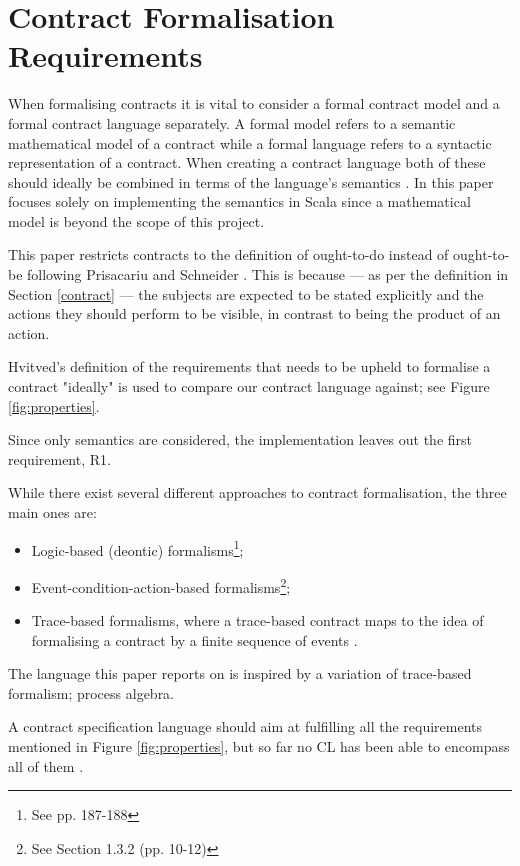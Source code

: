 \documentclass{ituthesis}
\begin{document}
\section{Contract Formalisation Requirements} \label{requirements}
When formalising contracts it is vital to consider a formal contract model and a formal contract language separately. A formal model refers to a semantic mathematical model of a contract while a formal language refers to a syntactic representation of a contract. When creating a contract language both of these should ideally be combined in terms of the language's semantics \cite{hvitved2011contract}. In this paper focuses solely on implementing the semantics in Scala since a mathematical model is beyond the scope of this project.

This paper restricts contracts to the definition of ought-to-do instead of ought-to-be following Prisacariu and Schneider \cite{prisacariu2007formal}. This is because --- as per the definition in Section \ref{contract} --- the subjects are expected to be stated explicitly and the actions they should perform to be visible, in contrast to being the product of an action. 

Hvitved's definition of the requirements that needs to be upheld to formalise a contract "ideally" is used to compare our contract language against; see Figure \ref{fig:properties}.

Since only semantics are considered, the implementation leaves out the first requirement, R1.

While there exist several different approaches to contract formalisation, the three main ones are:
\begin{itemize}
    \item Logic-based (deontic) formalisms\footnote{See \cite{hvitved2011contract} pp. 187-188};
    \item Event-condition-action-based formalisms\footnote{See \cite{hvitved2011contract} Section 1.3.2 (pp. 10-12)};
    \item Trace-based formalisms, where a trace-based contract maps to the idea of formalising a contract by a finite sequence of events \cite{andersen2006compositional}.
\end{itemize}

The language this paper reports on is inspired by a variation of trace-based formalism; process algebra.

A contract specification language should aim at fulfilling all the requirements mentioned in Figure \ref{fig:properties}, but so far no CL has been able to encompass all of them \cite{hvitved2011contract}.
\end{document}

